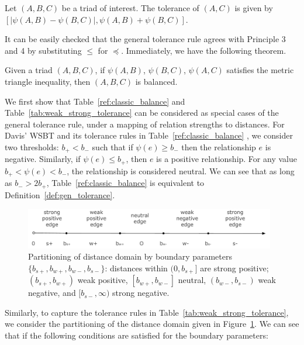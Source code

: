 {\begin{definition} \label{def:gen_tolerance}
Let $(A,B,C)$ be a triad of interest. The tolerance of $(A,C)$
is given by $[|\psi(A,B)-\psi(B,C)|, \psi(A,B)+\psi(B,C)]$. 
\end{definition}

It can be easily checked that the general tolerance rule agrees with
Principle 3 and 4 by substituting $\leq$ for $\preceq$.  Immediately, we have the following
theorem.
\begin{theorem} 
Given a triad $(A,B,C)$, if $\psi(A,B)$, $\psi(B,C)$, $\psi(A,C)$
satisfies the metric triangle inequality, then $(A,B,C)$ is balanced.
\end{theorem}

We first show that Table~\ref{ref:classic_balance} and Table~\ref{tab:weak_strong_tolerance} can be considered as special cases of the general tolerance rule, under a mapping of relation strengths to distances. For Davis' WSBT and its tolerance rules in Table~\ref{ref:classic_balance} , we consider two thresholds:
$b_{+} < b_{-}$ such that if $\psi(e)\geq b_{-}$ then the relationship
$e$ is negative. Similarly, if $\psi(e)\leq b_{+}$, then $e$ is
a positive relationship. For any value $b_{+} < \psi(e) < b_{-}$, the
relationship is considered neutral. We can see that as long as
$b_{-}>2b_{+}$, Table~\ref{ref:classic_balance} is equivalent to
Definition~\ref{def:gen_tolerance}.

\begin{figure}[th]
\centering
\includegraphics[height=0.7in]{Figs/mapping2.pdf}
\caption{\label{fig:partition}Partitioning of distance domain by boundary
  parameters $\{b_{s+}, b_{w+}, b_{w-}, b_{s-}\}$: distances within $(0,b_{s+}]$ are strong positive; $(b_{s+}, b_{w+})$ weak
  positive, $[b_{w+}, b_{w-}]$ neutral, $(b_{w-}, b_{s-})$
  weak negative, and $ [b_{s-}, \infty)$ strong negative.}

\end{figure}

Similarly, to capture the tolerance rules in Table~\ref{tab:weak_strong_tolerance},
we consider the partitioning of the distance domain given in
Figure~\ref{fig:partition}. We can see that if the following
conditions are satisfied for the boundary parameters: 

}
